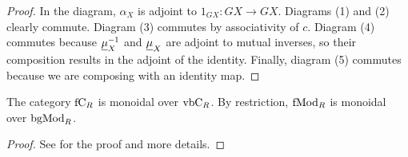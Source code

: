 \documentclass[twoside]{article}
\begin{document}
\begin{proof}
%

In the diagram, $\alpha_X$ is adjoint to $1_{GX}:GX\to GX$. Diagrams (1) and (2) clearly commute. Diagram (3) commutes by associativity of $c$. Diagram (4) commutes because $\underline{\mu}^{-1}_X$ and $\underline{\mu}_X$ are adjoint to mutual inverses, so their composition results in the adjoint of the identity. Finally, diagram (5) commutes because we are composing with an identity map. 
\end{proof}

\begin{lem}\label{4.15}
The category $\mathrm{fC}_R$ is monoidal over $\mathrm{vbC}_R$. By restriction, $\mathrm{fMod}_R$ is monoidal over $\mathrm{bgMod}_R$.
\end{lem}
\begin{proof}
See \cite[Lemma 4.15]{whitehouse} for the proof and more details.
\end{proof}
\end{document}
